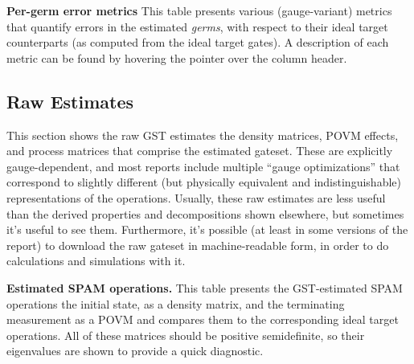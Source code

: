 \documentclass{article}[11pt]
\newcommand{\putfield}[2]{#2}
\begin{document}
{\begin{table}[h]
  \begin{center}
    \begin{adjustbox}{max width=\textwidth}
      \putfield{bestGatesVsTargetTable_gvgerms}{}
    \end{adjustbox}
    \caption{\textbf{Per-germ error metrics} This table presents various (gauge-variant) metrics that quantify errors in the estimated \emph{germs}, with respect to their ideal target counterparts (as computed from the ideal target gates).  A description of each metric can be found by  hovering the pointer over the column header.}
  \end{center}
\end{table}


\subsection{Raw Estimates\label{sec_raw_estimates}}
This section shows the raw GST estimates \textendash the density matrices, POVM effects, and process matrices that comprise the estimated gateset.  These are explicitly gauge-dependent, and most reports include multiple ``gauge optimizations'' that correspond to slightly different (but physically equivalent and indistinguishable) representations  of the operations.  Usually, these raw estimates are less useful than the derived properties and decompositions shown elsewhere, but sometimes it's useful to see them.  Furthermore, it's possible (at least in some versions of the report) to download the raw gateset in machine-readable form, in order to do calculations and simulations with it.

\begin{table}[h]
  \begin{center}
    \begin{adjustbox}{max width=\textwidth}
      \putfield{bestGatesetSpamBriefTable}{}
    \end{adjustbox}
    \caption{\textbf{Estimated SPAM operations.} This table presents the GST-estimated SPAM operations \textendash the initial state, as a density matrix, and the terminating measurement as a POVM \textendash and compares them to the corresponding ideal target operations.  All of these matrices should be positive semidefinite, so their eigenvalues are shown to provide a quick diagnostic.}
  \end{center}
\end{table}


}
\end{document}
